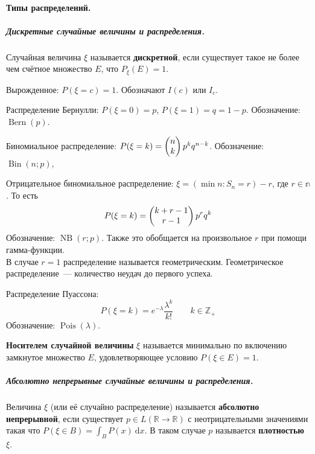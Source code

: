 \documentclass{article}
\begin{document}
    \paragraph{Типы распределений.}
    \subparagraph{Дискретные случайные величины и распределения.}
    \begin{definition}
        Случайная величина $\xi$ называется \textbf{дискретной}, если существует такое не более чем счётное множество $E$, что $P_\xi(E)=1$.
    \end{definition}
    \begin{example}
        Вырожденное: $P(\xi=c)=1$. Обозначают $I(c)$ или $I_c$.
    \end{example}
    \begin{example}
        Распределение Бернулли: $P(\xi=0)=p$, $P(\xi=1)=q=1-p$. Обозначение: $\operatorname{Bern}(p)$.
    \end{example}
    \begin{example}
        Биномиальное распределение: $P(\xi=k)=\left(\begin{matrix}n\\k\end{matrix}\right) p^kq^{n-k}$. Обозначение: $\operatorname{Bin}(n;p)$,
    \end{example}
    \begin{example}
        Отрицательное биномиальное распределение: $\xi=(\min n:S_n=r)-r$, где $r\in\mathbb n$. То есть
        $$
        P(\xi=k)=\left(\begin{matrix}k+r-1\\r-1\end{matrix}\right)p^{r}q^{k}
        $$
        Обозначение: $\operatorname{NB}(r;p)$. Также это обобщается на произвольное $r$ при помощи гамма-функции.\\
        В случае $r=1$ распределение называется геометрическим. Геометрическое распределение~--- количество неудач до первого успеха.
    \end{example}
    \begin{example}
        Распределение Пуассона:
        $$
        P(\xi=k)=e^{-\lambda}\frac{\lambda^k}{k!}\qquad k\in\mathbb Z_+
        $$
        Обозначение: $\operatorname{Pois}(\lambda)$.
    \end{example}
    \begin{definition}
        \textbf{Носителем случайной величины} $\xi$ называется минимально по включению замкнутое множество $E$, удовлетворяющее условию $P(\xi\in E)=1$.
    \end{definition}
    \subparagraph{Абсолютно непрерывные случайные величины и распределения.}
    \begin{definition}
        Величина $\xi$ (или её случайно распределение) называется \textbf{абсолютно непрерывной},  если существует $p\in L(\mathbb R\to\mathbb R)$ с неотрицательными значениями такая что $P(\xi\in B)=\int_BP(x)~\mathrm dx$. В таком случае $p$ называется \textbf{плотностью} $\xi$.
    \end{definition}
\end{document}
